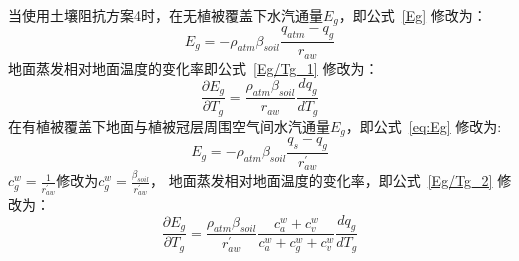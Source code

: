 当使用土壤阻抗方案4时，在无植被覆盖下水汽通量\(E_{g}\)，即公式~\eqref{Eg} 修改为：
\begin{equation}\label{Eg_modify}
E_{g}=-\rho_{atm}\beta_{soil} \frac{q_{atm}-q_{g}}{r_{a w}}
\end{equation}
地面蒸发相对地面温度的变化率即公式~\eqref{Eg/Tg_1} 修改为：
\begin{equation}
     \frac{\partial E_{g}}{\partial T_{g}}= \frac{\rho_{atm} \beta_{soil}}{r_{a w} } \frac{d q_{g}}{d T_{g}}
\end{equation}
在有植被覆盖下地面与植被冠层周围空气间水汽通量\(E_{g}\)，即公式~\eqref{eq:Eg} 修改为:
\begin{equation}
E_{g}=-\rho_{atm} \beta_{soil} \frac{q_{s}-q_{g}}{r_{a w}^{\prime}}
\end{equation}
$c_g^w=\frac{1}{r_{aw}^\prime}$修改为$c_g^w=\frac{\beta_{soil}}{r_{aw}^\prime}$，
地面蒸发相对地面温度的变化率，即公式~\eqref{Eg/Tg_2} 修改为：
\begin{equation}
\frac{\partial E_{g}}{\partial T_{g}}=
      \frac{\rho_{atm} \beta_{soil}}{r_{a w}^{\prime}} \frac{c_{a}^{w}+c_{v}^{w}}{c_{a}^{w}+c_{g}^{w}+c_{v}^{w}} \frac{d q_{g}}{d T_{g}}
\end{equation}